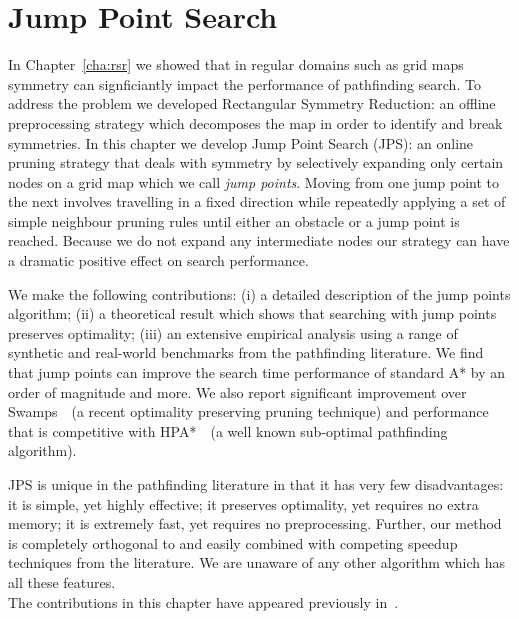 \chapter{Jump Point Search}
\label{cha::jps}
In Chapter~\ref{cha:rsr} we showed that in regular domains such as grid maps
symmetry can signficiantly impact the performance of pathfinding search.
 To address the problem we developed Rectangular Symmetry Reduction:
 an offline preprocessing strategy which decomposes the map in order to 
identify and break symmetries.
 In this chapter we develop Jump Point Search 
(JPS): an online pruning strategy that
deals with symmetry by selectively expanding only certain nodes on a grid map
which we call \emph{jump points}.  
Moving from one jump point to the next
involves travelling in a fixed direction while repeatedly applying a set of
simple neighbour pruning rules until either an obstacle or a jump point is
reached.  Because we do not expand any intermediate nodes %
our strategy can have a dramatic positive effect on search performance.
\par
We make the following contributions: (i) a detailed description of the jump
points algorithm; (ii) a theoretical result which shows that searching with jump
points preserves optimality;  (iii) an extensive empirical analysis using
a range of synthetic and real-world benchmarks from the pathfinding literature.
We find that jump points can improve the search time performance of standard A* by
an order of magnitude and more.  We also report significant improvement over
Swamps~\citep{pochter10}~(a recent optimality preserving pruning technique) and
performance that is competitive with HPA*~\citep{botea04}~(a well known 
sub-optimal pathfinding algorithm).
\par
JPS is unique in the pathfinding literature in that it has very few
disadvantages: it is simple, yet highly effective; it preserves optimality, yet
requires no extra memory;  it is extremely fast, yet requires no preprocessing.
Further, our method is completely orthogonal to and easily combined with 
competing speedup techniques from the literature.
We are unaware of any other algorithm which has all these features.
\\ \newline 
The contributions in this chapter have appeared previously in~\cite{harabor11b,harabor12}.
\newpage
